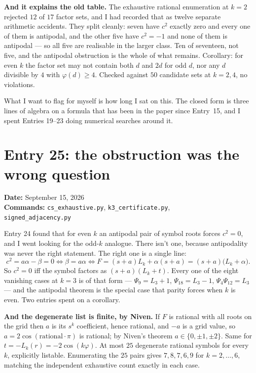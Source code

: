 \documentclass[12pt]{article}
\begin{document}
\textbf{And it explains the old table.} The exhaustive rational enumeration at
$k=2$ rejected $12$ of $17$ factor sets, and I had recorded that as twelve
separate arithmetic accidents. They split cleanly: seven have $c^{2}$ exactly
zero and every one of them is antipodal, and the other five have $c^{2}=-1$ and
none of them is antipodal --- so all five are realisable in the larger class.
Ten of seventeen, not five, and the antipodal obstruction is the whole of what
remains. Corollary: for even $k$ the factor set may not contain both $d$ and
$2d$ for odd $d$, nor any $d$ divisible by $4$ with $\varphi(d)\ge4$. Checked
against $50$ candidate sets at $k=2,4$, no violations.

What I want to flag for myself is how long I sat on this. The closed form is
three lines of algebra on a formula that has been in the paper since Entry~15,
and I spent Entries 19--23 doing numerical searches around it.


\clearpage
\section*{Entry 25: the obstruction was the wrong question}
\textbf{Date:} September 15, 2026\\
\textbf{Commands:} {\small\texttt{cs\_exhaustive.py}, \texttt{k3\_certificate.py},}\\
{\small\texttt{signed\_adjacency.py}}

Entry 24 found that for even $k$ an antipodal pair of symbol roots forces
$c^{2}=0$, and I went looking for the odd-$k$ analogue. There isn't one, because
antipodality was never the right statement. The right one is a single line:
\[
  c^{2}=a\alpha-\beta=0
  \iff \beta=a\alpha
  \iff F=(s+a)L_k+\alpha(s+a)=(s+a)\bigl(L_k+\alpha\bigr).
\]
So $c^{2}=0$ iff the symbol factors as $(s+a)(L_k+t)$. Every one of the eight
vanishing cases at $k=3$ is of that form --- $\Psi_9=L_3+1$, $\Psi_{18}=L_3-1$,
$\Psi_4\Psi_{12}=L_3$ --- and the antipodal theorem is the special case that
parity forces when $k$ is even. Two entries spent on a corollary.

\textbf{And the degenerate list is finite, by Niven.} If $F$ is rational with
all roots on the grid then $a$ is its $s^{k}$ coefficient, hence rational, and
$-a$ is a grid value, so $a=2\cos(\text{rational}\cdot\pi)$ is rational; by
Niven's theorem $a\in\{0,\pm1,\pm2\}$. Same for $t=-L_k(r)=-2\cos(k\varphi)$.
At most $25$ degenerate rational symbols for every $k$, explicitly listable.
Enumerating the $25$ pairs gives $7,8,7,6,9$ for $k=2,\dots,6$, matching the
independent exhaustive count exactly in each case.
\end{document}
